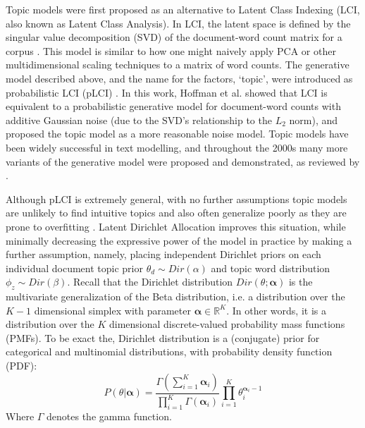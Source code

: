 Topic models were first proposed as an alternative to Latent Class Indexing (LCI, also known as Latent Class Analysis). In LCI, the latent space is defined by the singular value decomposition (SVD) of the document-word count matrix for a corpus \citep{Deerwester90indexingby}. This model is similar to how one might naively apply PCA or other multidimensional scaling techniques to a matrix of word counts. The generative model described above, and the name for the factors, `topic', were introduced as probabilistic LCI (pLCI) \citep{hofmann1999plsa}. In this work, Hoffman et al. showed that LCI is equivalent to a probabilistic generative model for document-word counts with additive Gaussian noise (due to the SVD's relationship to the $L_2$ norm), and proposed the topic model as a more reasonable noise model. Topic models have been widely successful in text modelling, and throughout the 2000s many more variants of the generative model were proposed and demonstrated, as reviewed by \citep{Blei2010}.


Although pLCI is extremely general, with no further assumptions topic models are unlikely to find intuitive topics and also often generalize poorly as they are prone to overfitting \citep{Blei2003}.
Latent Dirichlet Allocation improves this situation, while minimally decreasing the expressive power of the model in practice by making a further assumption, namely, placing independent Dirichlet priors on each individual document topic prior $\theta_d \sim Dir(\alpha)$ and topic word distribution $\phi_z \sim Dir(\beta)$.
Recall that the Dirichlet distribution $Dir(\theta; \boldsymbol{\alpha})$ is the multivariate generalization of the Beta distribution, i.e. a distribution over the $K-1$ dimensional simplex with parameter $\boldsymbol{\alpha} \in \mathbb{R}^K$. In other words, it is a distribution over the $K$ dimensional discrete-valued probability mass functions (PMFs). To be exact the, Dirichlet distribution is a (conjugate) prior for categorical and multinomial distributions, with probability density function (PDF):
\begin{equation}
P(\theta|\boldsymbol{\alpha}) = \frac{\Gamma(\sum_{i=1}^{K} \boldsymbol{\alpha}_i)}{\prod_{i=1}^{K} \Gamma(\boldsymbol{\alpha}_i)} \prod_{i=1}^{K} \theta_i^{\boldsymbol{\alpha}_i -1}
\end{equation}
Where $\Gamma$ denotes the gamma function.

